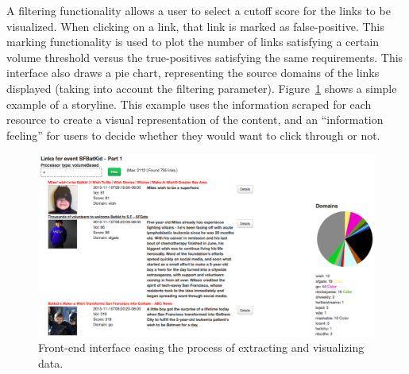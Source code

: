 \documentclass{sig-alternate}
\begin{document}
A filtering functionality allows a user to select a cutoff score for the links to be visualized. When clicking on a link, that link is marked as false-positive. This marking functionality is used to plot the number of links satisfying a certain volume threshold versus the true-positives satisfying the same requirements. This interface also draws a pie chart, representing the source domains of the links displayed (taking into account the filtering parameter). Figure~\ref{fig:javascript_interface} shows a simple example of a storyline. This example uses the information scraped for each resource to create a visual representation of the content, and an ``information feeling'' for users to decide whether they would want to click through or not.
\begin{figure}[htbp]
  \centering
  \includegraphics[width=\linewidth]{Figures/javascript_interface.png}
  \caption{Front-end interface easing the process of extracting and visualizing data.}
  \label{fig:javascript_interface}
\end{figure}

\end{document}

